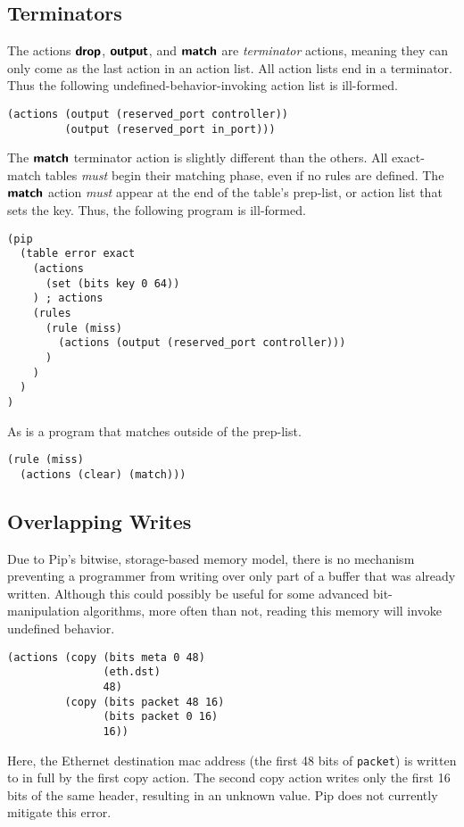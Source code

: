 \subsection{Terminators}
The actions $\bm{\mathsf{{drop}}}$, $\bm{\mathsf{{output}}}$, and $\bm{\mathsf{{match}}}$ are \textit{terminator} actions, meaning they can only come as the last action in an action list. All action lists end in a terminator. Thus the following undefined-behavior-invoking action list is ill-formed.
\begin{lstlisting}
(actions (output (reserved_port controller)) 
         (output (reserved_port in_port)))
\end{lstlisting}
The $\bm{\mathsf{{match}}}$ terminator action is slightly different than the others. All exact-match tables \textit{must} begin their matching phase, even if no rules are defined. The $\bm{\mathsf{{match}}}$ action \textit{must} appear at the end of the table's prep-list, or action list that sets the key. Thus, the following program is ill-formed.
\begin{lstlisting}
(pip
  (table error exact
    (actions
      (set (bits key 0 64))
    ) ; actions
    (rules
      (rule (miss)
        (actions (output (reserved_port controller)))
      )
    )
  )
)
\end{lstlisting}
As is a program that matches outside of the prep-list.
\begin{lstlisting}
(rule (miss)
  (actions (clear) (match)))
\end{lstlisting}

\subsection{Overlapping Writes}
Due to Pip's bitwise, storage-based memory model, there is no mechanism preventing a programmer from writing over only part of a buffer that was already written. Although this could possibly be useful for some advanced bit-manipulation algorithms, more often than not, reading this memory will invoke undefined behavior.
\begin{lstlisting}
(actions (copy (bits meta 0 48)
               (eth.dst)
               48)
         (copy (bits packet 48 16)
               (bits packet 0 16)
               16))
\end{lstlisting}
Here, the Ethernet destination mac address (the first 48 bits of \texttt{packet}) is written to in full by the first copy action. The second copy action writes only the first 16 bits of the same header, resulting in an unknown value. Pip does not currently mitigate this error.
